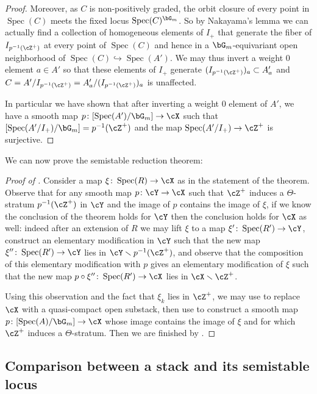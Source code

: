 \documentclass[a4paper]{amsart}
\numberwithin{equation}{section}
\theoremstyle{plain}
\theoremstyle{definition}
\DeclareMathOperator{\Spec}{Spec}
\newcommand{\co}{\colon}
\begin{document}
\begin{proof}
Moreover, as $C$ is non-positively graded, the orbit closure of every point in $\Spec(C)$ meets the fixed locus $\Spec(C)^{\bG_m}$. So by Nakayama's lemma we can actually find a collection of homogeneous elements of $I_+$ that generate the fiber of $I_{p^{-1}(\cZ^+)}$ at every point of $\Spec(C)$ and hence in a $\bG_m$-equivariant open neighborhood of $\Spec(C) \hookrightarrow \Spec(A')$. We may thus invert a weight $0$ element $a \in A'$ so that these elements of $I_+$ generate $(I_{p^{-1}(\cZ^+)})_a \subset A'_a$ and $C = A' /I_{p^{-1}(\cZ^+)} = A'_a / (I_{p^{-1}(\cZ^+)})_a$ is unaffected.

In particular we have shown that after inverting a weight $0$ element of $A'$, we have a smooth map $p \co [\Spec(A')/\bG_m] \to \cX$ such that $[\Spec(A'/I_+)/\bG_m] = p^{-1}(\cZ^+)$ and the map $\Spec(A'/I_+) \to \cZ^+$ is surjective.
\end{proof}



We can now prove the semistable reduction theorem:

\begin{proof}[Proof of ]
Consider a map $\xi \co \Spec(R) \to \cX$ as in the statement of the theorem. Observe that for any smooth map $p \co \cY \to \cX$ such that {$\cZ^+$} induces a $\Theta$-stratum $p^{-1}(\cZ^+)$ in $\cY$ and the image of $p$ contains the image of $\xi$, if we know the conclusion of the theorem holds for $\cY$ then the conclusion holds for $\cX$ as well: indeed after an extension of $R$ we may lift $\xi$ to a map $\xi' \co \Spec(R') \to \cY$, construct an elementary modification in $\cY$ such that the new map $\xi'' \co \Spec(R') \to \cY$ lies in $\cY \smallsetminus p^{-1}(\cZ^+)$, and observe that the composition of this elementary modification with $p$ gives an elementary modification of $\xi$ such that the new map $p \circ \xi'' \co \Spec(R') \to \cX$ lies in $\cX \smallsetminus \cZ^+$.

Using this observation and the fact that $\xi_k$ lies in $\cZ^+$, we may use  to replace $\cX$ with a quasi-compact open substack, then use  to construct a smooth map $p \co [\Spec(A)/\bG_m] \to \cX$ whose image contains the image of $\xi$ and for which $\cZ^+$ induces a $\Theta$-stratum. Then we are finished by .
\end{proof}


\subsection{Comparison between a stack and its semistable locus}
\end{document}
